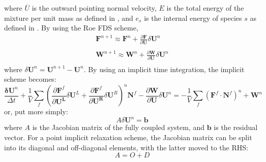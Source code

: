 where $\overline{U}$ is the outward pointing normal velocity, $E$ is
the total energy of the mixture per unit mass as defined in
, and $e_s$ is the internal energy of species $s$ as
defined in .  By using the Roe FDS scheme,
\begin{equation}
	\begin{matrix}
		\mathbf{F}^{n+1} \approx \mathbf{F}^n+\frac{\partial \mathbf{F}}{\partial \mathbf{U}}\delta\mathbf{U}^n \\
		\\
		\mathbf{W}^{n+1} \approx \mathbf{W}^n+\frac{\partial \mathbf{W}}{\partial \mathbf{U}}\delta\mathbf{U}^n \\
	\end{matrix}
\end{equation}
where $\delta\mathbf{U}^n = \mathbf{U}^{n+1}- \mathbf{U}^{n}$.  By using an
implicit time integration, the implicit scheme becomes:
\begin{equation}
	\frac{\mathbf{\delta U}^n}{\Delta t}+\frac{1}{V}\sum\limits_{f}(\frac{\partial \mathbf{F}^f}{\partial \mathbf{U^L}}\delta\mathbf{U}^L
	+\frac{\partial \mathbf{F}^f}{\partial \mathbf{U^R}}\delta\mathbf{U}^R)^n \mathbf{N}^f
	- \frac{\partial \mathbf{W}}{\partial \mathbf{U}}\delta\mathbf{U}^n
	= -\frac{1}{V}\sum\limits_{f}(\mathbf{F}^f\cdot\mathbf{N}^f)^n + \mathbf{W}^n
\end {equation}
or, put more simply:
\begin{equation}
	A\delta\mathbf{U}^n = \mathbf{b}
\end{equation}
where $A$ is the Jacobian matrix of the fully coupled system, and $\mathbf{b}$
is the residual vector.  For a point implicit relaxation scheme, the Jacobian
matrix can be split into its diagonal and off-diagonal elements, with the latter
moved to the RHS:
\begin{equation}
\label{decomp-jac}
	A=O+D
\end{equation}
